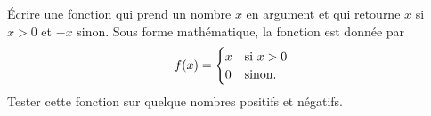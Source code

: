 
\begin{exercice}\label{exosmath-0172}

Écrire une fonction qui prend un nombre \( x\) en argument et qui retourne \( x\) si \( x>0\) et \( -x\) sinon. Sous forme mathématique, la fonction est donnée par
\begin{equation}
    f(x)=\begin{cases}
        x    &   \text{si \( x>0\)}\\
        0    &    \text{sinon}.
    \end{cases}
\end{equation}
Tester cette fonction sur quelque nombres positifs et négatifs.

\end{exercice}
